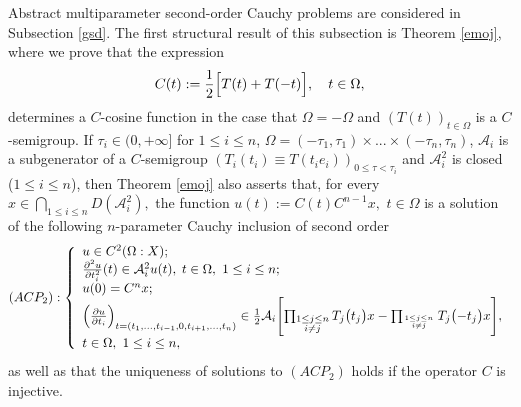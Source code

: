 \documentclass{amsart}
\theoremstyle{definition}
\theoremstyle{remark}
\numberwithin{equation}{section}
\begin{document}
Abstract multiparameter second-order Cauchy problems are considered in Subsection \ref{gsd}. The first structural result of this subsection is Theorem \ref{emoj}, where we prove that the expression 
\begin{align*} 
C(t):=\frac{1}{2}\Bigl[ T(t)+T(-t)\Bigr],\quad t\in \Omega,
\end{align*}
determines a $C$-cosine function in the case that $\Omega=-\Omega$ and $(T(t))_{t\in \Omega}$ is a $C$-semigroup. If $\tau_{i}\in (0,+\infty]$ for $1\leq i \leq n$, $\Omega =(-\tau_{1},\tau_{1}) \times ... \times (-\tau_{n},\tau_{n})$, ${\mathcal A}_{i}$ is a subgenerator of a $C$-semigroup $(T_{i}(t_{i}) \equiv T(t_{i}e_{i}))_{0\leq \tau <\tau_{i}}$ 
and
${\mathcal A}_{i}^{2}$ is closed ($1\leq i\leq n$), then Theorem \ref{emoj} also asserts that, for every $x\in \bigcap_{1\leq i \leq n}D({\mathcal A}_{i}^{2}),$ the function $u(t):=C(t)C^{n-1}x,$ $t\in \Omega$ is a solution of the following $n$-parameter Cauchy inclusion of second order
\[ (ACP_{2}): \left\{
\begin{array}{l}
u\in C^{2}(\Omega : X);\\ \frac{\partial ^{2}u}{\partial t_{i}^{2}}(t)\in {\mathcal A}_{i}^{2}u(t),\;t \in \Omega,\ 1\leq i\leq n;\\
u(0)=C^{n}x;\\  \Bigl( \frac{\partial u}{\partial t_{i}}\Bigr)_{t=(t_{1},...,t_{i-1},0,t_{i+1},...,t_{n})} \in \frac{1}{2}{\mathcal A}_{i}\Biggl[       
\prod_{\substack{1\le j\le n\\ i\ne j}} T_{j}\bigl( t_{j}\bigr)x-\prod_{1\leq j\leq n\atop i\neq j} T_{j}\bigl( -t_{j}\bigr)x\Biggr],\\ t\in \Omega,\ 1\leq i\leq n,
\end{array}
\right. \]
as well as that the uniqueness of solutions to $(ACP_{2})$ holds if the operator $C$ is injective.
\end{document}
